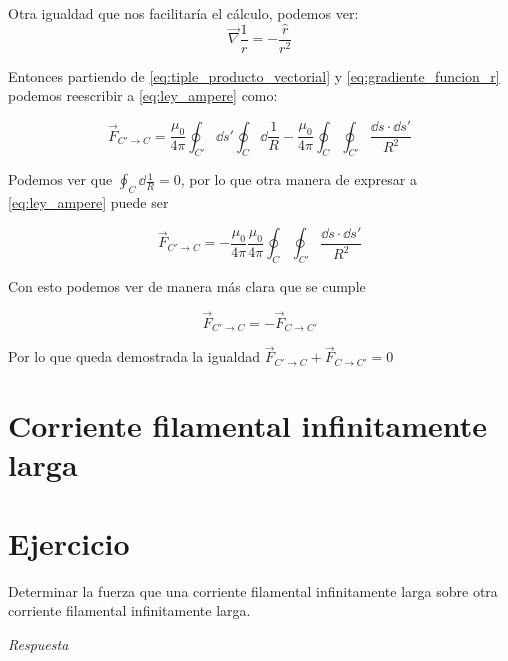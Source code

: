 \documentclass[11pt]{report}
\theoremstyle{plain}
\theoremstyle{definition}
\begin{document}
Otra igualdad que nos facilitaría el cálculo, podemos ver:
\begin{equation}
	\vec{\nabla}\frac{1}{r}=-\frac{\hat{r}}{r^2}
	\label{eq:gradiente_funcion_r}
\end{equation}

Entonces partiendo de \ref{eq:tiple_producto_vectorial} y \ref{eq:gradiente_funcion_r} podemos reescribir a \ref{eq:ley_ampere} como:

\begin{equation*}
	\vec{F}_{C' \rightarrow C} = \frac{\mu_0}{4\pi} \oint_{C'} \dd{s'} \oint_C \dd{\frac{1}{R}} - \frac{\mu_0}{4\pi}\oint_C \oint_{C'} \frac{\dd{s} \cdot \dd{s'}}{R^2}
\end{equation*}

Podemos ver que $\oint_C \dd{\frac{1}{R}} = 0$, por lo que otra manera de expresar a \ref{eq:ley_ampere} puede ser 


\begin{equation} %
	\vec{F}_{C' \rightarrow C} = - \frac{\mu_0}{4\pi} \frac{\mu_0}{4\pi}\oint_C \oint_{C'} \frac{\dd{s} \cdot \dd{s'}}{R^2}
	\label{eq:ley_ampere_no_cruz}
\end{equation}


Con esto podemos ver de manera más clara que se cumple

\begin{equation*} %
	\vec{F}_{C' \rightarrow C} = - \vec{F}_{C \rightarrow C'} 
\end{equation*}

Por lo que queda demostrada la igualdad $\vec{F}_{C' \rightarrow C} + \vec{F}_{C \rightarrow C'} = 0$\\


\section{Corriente filamental infinitamente larga}

\section*{Ejercicio}
Determinar la fuerza que una corriente filamental infinitamente larga sobre otra corriente filamental infinitamente larga.



\textit{Respuesta}\\
\end{document}
